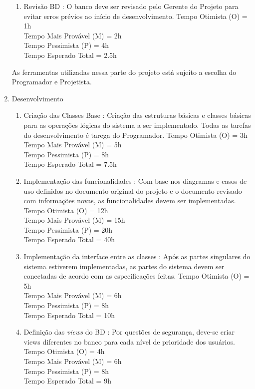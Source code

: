 \documentclass[12pt,a4paper,final]{report}
\begin{document}
\begin{enumerate}
\begin{enumerate}
\item Revisão BD : O banco deve ser revisado pelo Gerente do Projeto para evitar erros prévios ao início de desenvolvimento.
Tempo Otimista (O) = 1h\\
Tempo Mais Provável (M) = 2h\\
Tempo Pessimista (P) = 4h\\
Tempo Esperado Total = 2.5h
\end{enumerate}

As ferramentas utilizadas nessa parte do projeto está sujeito a escolha do Programador e Projetista.

\item Desenvolvimento
\begin{enumerate}

\item Criação das Classes Base : Criação das estruturas básicas e classes básicas para as operações lógicas do sistema a ser implementado. Todas as tarefas do desenvolvimento é tarega do Programador.
Tempo Otimista (O) = 3h\\
Tempo Mais Provável (M) = 5h\\
Tempo Pessimista (P) = 8h\\
Tempo Esperado Total = 7.5h

\item Implementação das funcionalidades : Com base nos diagramas e casos de uso definidos no documento original do projeto e o documento revisado com informações novas, as funcionalidades devem ser implementadas.
Tempo Otimista (O) = 12h\\
Tempo Mais Provável (M) = 15h\\
Tempo Pessimista (P) = 20h\\
Tempo Esperado Total = 40h

\item Implementação da interface entre as classes : Após as partes singulares do sistema estiverem implementadas, as partes do sistema devem ser conectadas de acordo com as especificações feitas.
Tempo Otimista (O) = 5h\\
Tempo Mais Provável (M) = 6h\\
Tempo Pessimista (P) = 8h\\
Tempo Esperado Total = 10h

\item Definição das \textit{views} do BD : Por questões de segurança, deve-se criar views diferentes no banco para cada nível de prioridade dos usuários.
Tempo Otimista (O) = 4h\\
Tempo Mais Provável (M) = 6h\\
Tempo Pessimista (P) = 8h\\
Tempo Esperado Total = 9h
\end{enumerate}


\end{enumerate}
\end{document}
